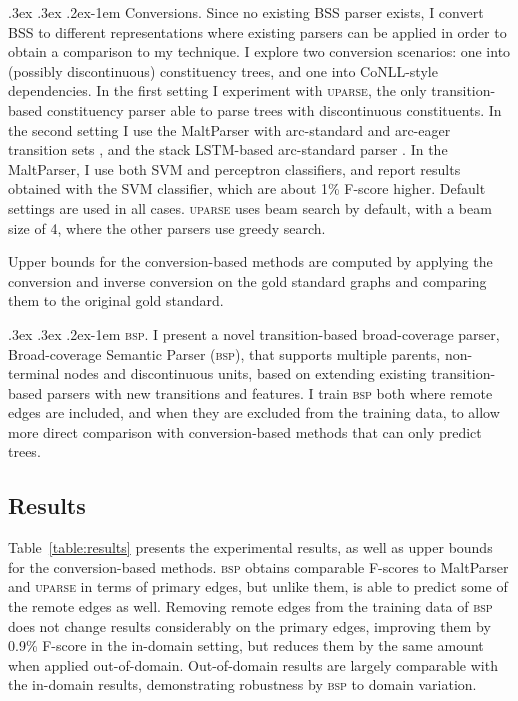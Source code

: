 \documentclass[11pt]{article}
\makeatletter
\newcommand{\tabref}[1]{Table~\ref{#1}}
\renewcommand{\paragraph}{
  \@startsection{paragraph}{4}
  {\z@}{.3ex \@plus .3ex \@minus .2ex}{-1em}
  {\normalfont\normalsize\bfseries}
}
\makeatother
\begin{document}
\paragraph{Conversions.}
Since no existing BSS parser exists, I convert BSS to different representations where
existing parsers can be applied in order to obtain a comparison to my technique.
I explore two conversion scenarios: one into (possibly discontinuous) constituency trees,
and one into CoNLL-style dependencies. In the first setting I experiment with \textsc{uparse},
the only transition-based constituency parser able to parse trees with
discontinuous constituents.
In the second setting I use the MaltParser with arc-standard and
arc-eager transition sets \cite{nivre2007maltparser},
and the stack LSTM-based arc-standard parser \cite{dyer2015transition}.
In the MaltParser, I use both SVM and perceptron classifiers, and report
results obtained with the SVM classifier, which are about 1\% F-score higher.
Default settings are used in all cases.
\textsc{uparse} uses beam search by default,
with a beam size of 4, where the other parsers use greedy search.

Upper bounds for the conversion-based methods are computed by applying
the conversion and inverse conversion on the gold standard
graphs and comparing them to the original gold standard.

\paragraph{\textsc{bsp}.}
I present a novel transition-based broad-coverage parser,
Broad-coverage Semantic Parser (\textsc{bsp}), that supports multiple parents,
non-terminal nodes and discontinuous units, based on extending existing
transition-based parsers with new transitions and features.
I train \textsc{bsp} both where remote edges
are included, and when they are excluded from the training data, to allow
more direct comparison with conversion-based methods that can only
predict trees.


\subsection{Results}\label{sec:results}

\tabref{table:results} presents the experimental results, as well as
upper bounds for the conversion-based methods.
\textsc{bsp} obtains comparable F-scores to MaltParser and \textsc{uparse}
in terms of primary edges, but unlike them, is able to predict some
of the remote edges as well. 
Removing remote edges from the training data of \textsc{bsp} does not
change results considerably on the primary edges,
improving them by 0.9\% F-score in the in-domain setting, but reduces
them by the same amount when applied out-of-domain. 
Out-of-domain results are largely comparable with the in-domain
results, demonstrating robustness by \textsc{bsp}
to domain variation.
\end{document}
